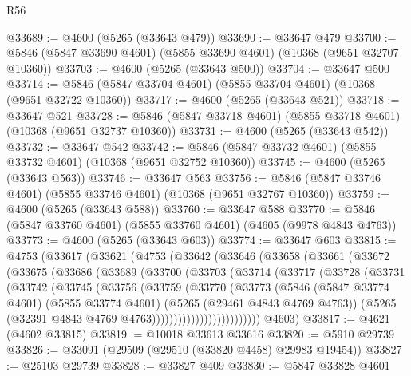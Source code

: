 \begin{lexlean}{R56}
\begin{coremodule}
@33689 := @4600 (@5265 (@33643 @479))
@33690 := @33647 @479
@33700 := @5846 (@5847 @33690 @4601) (@5855 @33690 @4601) (@10368 (@9651 @32707 @10360))
@33703 := @4600 (@5265 (@33643 @500))
@33704 := @33647 @500
@33714 := @5846 (@5847 @33704 @4601) (@5855 @33704 @4601) (@10368 (@9651 @32722 @10360))
@33717 := @4600 (@5265 (@33643 @521))
@33718 := @33647 @521
@33728 := @5846 (@5847 @33718 @4601) (@5855 @33718 @4601) (@10368 (@9651 @32737 @10360))
@33731 := @4600 (@5265 (@33643 @542))
@33732 := @33647 @542
@33742 := @5846 (@5847 @33732 @4601) (@5855 @33732 @4601) (@10368 (@9651 @32752 @10360))
@33745 := @4600 (@5265 (@33643 @563))
@33746 := @33647 @563
@33756 := @5846 (@5847 @33746 @4601) (@5855 @33746 @4601) (@10368 (@9651 @32767 @10360))
@33759 := @4600 (@5265 (@33643 @588))
@33760 := @33647 @588
@33770 := @5846 (@5847 @33760 @4601) (@5855 @33760 @4601) (@4605 (@9978 @4843 @4763))
@33773 := @4600 (@5265 (@33643 @603))
@33774 := @33647 @603
@33815 := @4753
    (@33617
      (@33621
        (@4753
          (@33642
            (@33646
              (@33658
                (@33661
                  (@33672
                    (@33675
                      (@33686
                        (@33689
                          (@33700
                            (@33703
                              (@33714
                                (@33717
                                  (@33728
                                    (@33731
                                      (@33742
                                        (@33745
                                          (@33756
                                            (@33759
                                              (@33770
                                                (@33773
                                                  (@5846
                                                    (@5847 @33774 @4601)
                                                    (@5855 @33774 @4601)
                                                    (@5265 (@29461 @4843 @4769 @4763))
                                                    (@5265
                                                      (@32391
                                                        @4843
                                                        @4769
                                                        @4763)))))))))))))))))))))))))
      @4603)
@33817 := @4621 (@4602 @33815)
@33819 := @10018 @33613 @33616
@33820 := @5910 @29739
@33826 := @33091 (@29509 (@29510 (@33820 @4458) @29983 @19454))
@33827 := @25103 @29739
@33828 := @33827 @409
@33830 := @5847 @33828 @4601

\end{coremodule}
\end{lexlean}
